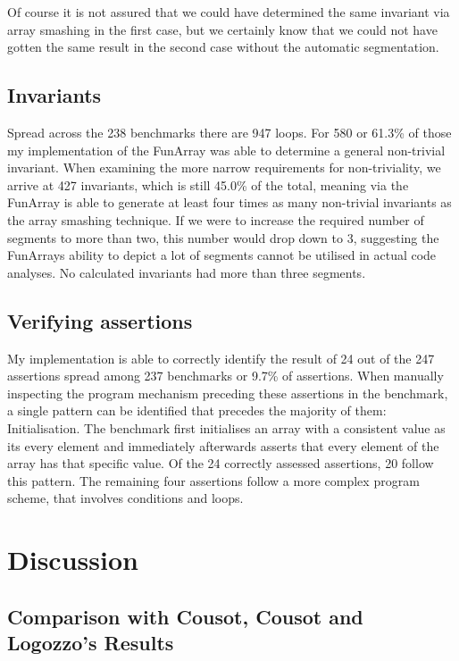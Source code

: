 \noindent Of course it is not assured that we could have determined the same invariant via array smashing in the first case, but we certainly know that we could not have gotten the same result in the second case without the automatic segmentation.


\subsection{Invariants}

Spread across the 238 benchmarks there are 947 loops. For 580 or 61.3\% of those my implementation of the FunArray was able to determine a general non-trivial invariant. When examining the more narrow requirements for non-triviality, we arrive at 427 invariants, which is still 45.0\% of the total, meaning via the FunArray is able to generate at least four times as many non-trivial invariants as the array smashing technique. If we were to increase the required number of segments to more than two, this number would drop down to 3, suggesting the FunArrays ability to depict a lot of segments cannot be utilised in actual code analyses. No calculated invariants had more than three segments.

\subsection{Verifying assertions}

My implementation is able to correctly identify the result of 24 out of the 247 assertions spread among 237 benchmarks or 9.7\% of assertions. When manually inspecting the program mechanism preceding these assertions in the benchmark, a single pattern can be identified that precedes the majority of them: Initialisation. The benchmark first initialises an array with a consistent value as its every element and immediately afterwards asserts that every element of the array has that specific value. Of the 24 correctly assessed assertions, 20 follow this pattern. The remaining four assertions follow a more complex program scheme, that involves conditions and loops.



\section{Discussion}
\subsection{Comparison with Cousot, Cousot and Logozzo's Results}

